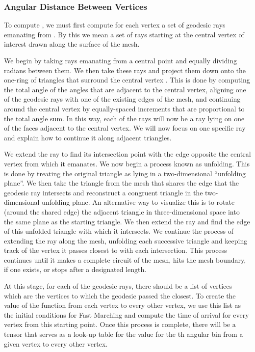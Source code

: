 \documentclass{article}
\begin{document}
\subsubsection{Angular Distance Between Vertices}

To compute , we must first compute for each vertex  a set of  geodesic rays emanating from . By this we mean a set of rays starting at the central vertex of interest drawn along the surface of the mesh. 



\iftrue We begin by taking  rays emanating from a central point and equally dividing  radians between them. We then take these  rays and project them down onto the one-ring of triangles that surround the central vertex . This is done by computing the total angle of the angles that are adjacent to the central vertex, aligning one of the geodesic rays with one of the existing edges of the mesh, and continuing around the central vertex by equally-spaced increments that are proportional to the total angle sum. In this way, each of the  rays will now be a ray lying on one of the faces adjacent to the central vertex. We will now focus on one specific ray and explain how to continue it along adjacent triangles.

We extend the ray to find its intersection point with the edge opposite the central vertex from which it emanates. We now begin a process known as unfolding. This is done by treating the original triangle as lying in a two-dimensional ``unfolding plane''. We then take the triangle from the mesh that shares the edge that the geodesic ray intersects and reconstruct a congruent triangle in the two-dimensional unfolding plane. An alternative way to visualize this is to rotate (around the shared edge) the adjacent triangle in three-dimensional space into the same plane as the starting triangle. We then extend the ray and find the edge of this unfolded triangle with which it intersects. We continue the process of extending the ray along the mesh, unfolding each successive triangle and keeping track of the vertex it passes closest to with each intersection. This process continues until it makes a complete circuit of the mesh, hits the mesh boundary, if one exists, or stops after a designated length.

At this stage, for each of the  geodesic rays, there should be a list of vertices which are the vertices to which the geodesic passed the closest. To create the value of the  function from each vertex to every other vertex, we use this list as the initial conditions for Fast Marching and compute the time of arrival for every vertex from this starting point. Once this process is complete, there will be a  tensor that serves as a look-up table for the  value for the th angular bin from a given vertex to every other vertex.
\end{document}

